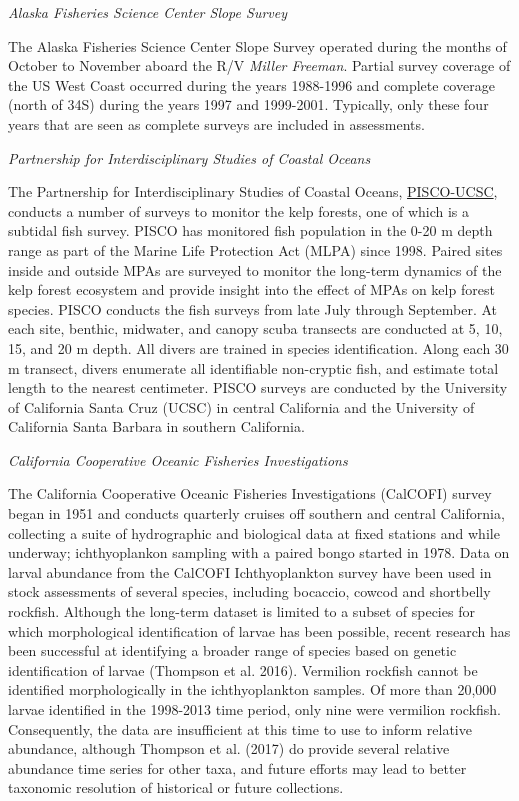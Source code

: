 \documentclass[11pt,
  english,
]{article}
\begin{document}
\emph{Alaska Fisheries Science Center Slope Survey}

The Alaska Fisheries Science Center Slope Survey operated during the months of October to November aboard the R/V \emph{Miller Freeman}. Partial survey coverage of the US West Coast occurred during the years 1988-1996 and complete coverage (north of 34\textquotesingle S) during the years 1997 and 1999-2001. Typically, only these four years that are seen as complete surveys are included in assessments.

\emph{Partnership for Interdisciplinary Studies of Coastal Oceans}

The Partnership for Interdisciplinary Studies of Coastal Oceans, {\href{http://www.piscoweb.org/kelp-forest-study}{PISCO-UCSC}\leavevmode\tagmcend\tagstructend}, conducts a number of surveys to monitor the kelp forests, one of which is a subtidal fish survey. PISCO has monitored fish population in the 0-20 m depth range as part of the Marine Life Protection Act (MLPA) since 1998. Paired sites inside and outside MPAs are surveyed to monitor the long-term dynamics of the kelp forest ecosystem and provide insight into the effect of MPAs on kelp forest species. PISCO conducts the fish surveys from late July through September. At each site, benthic, midwater, and canopy scuba transects are conducted at 5, 10, 15, and 20 m depth. All divers are trained in species identification. Along each 30 m transect, divers enumerate all identifiable non-cryptic fish, and estimate total length to the nearest centimeter. PISCO surveys are conducted by the University of California Santa Cruz (UCSC) in central California and the University of California Santa Barbara in southern California.

\emph{California Cooperative Oceanic Fisheries Investigations}

The California Cooperative Oceanic Fisheries Investigations (CalCOFI) survey began in 1951 and conducts quarterly cruises off southern and central California, collecting a suite of hydrographic and biological data at fixed stations and while underway; ichthyoplankon sampling with a paired bongo started in 1978. Data on larval abundance from the CalCOFI Ichthyoplankton survey have been used in stock assessments of several species, including bocaccio, cowcod and shortbelly rockfish. Although the long-term dataset is limited to a subset of species for which morphological identification of larvae has been possible, recent research has been successful at identifying a broader range of species based on genetic identification of larvae {(Thompson et al. 2016)\leavevmode\tagmcend\tagstructend}. Vermilion rockfish cannot be identified morphologically in the ichthyoplankton samples. Of more than 20,000 larvae identified in the 1998-2013 time period, only nine were vermilion rockfish. Consequently, the data are insufficient at this time to use to inform relative abundance, although Thompson et al. {(2017)\leavevmode\tagmcend\tagstructend} do provide several relative abundance time series for other taxa, and future efforts may lead to better taxonomic resolution of historical or future collections.
\end{document}
